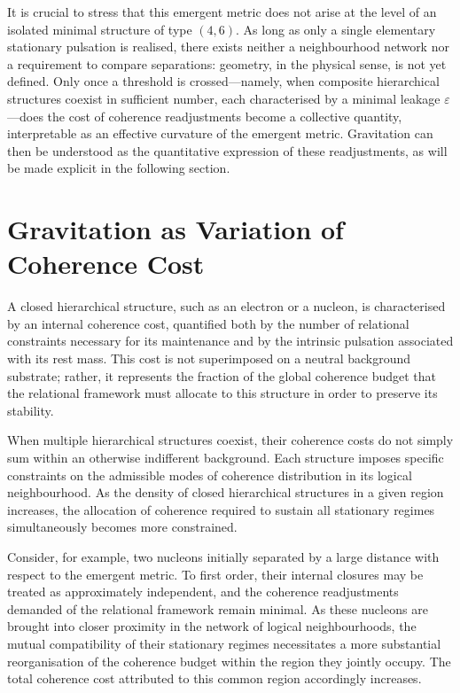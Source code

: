 \documentclass[11pt,a4paper]{article}
\begin{document}
It is crucial to stress that this emergent metric does not arise at the level of an isolated minimal structure of type \((4,6)\). As long as only a single elementary stationary pulsation is realised, there exists neither a neighbourhood network nor a requirement to compare separations: geometry, in the physical sense, is not yet defined. Only once a threshold is crossed—namely, when composite hierarchical structures coexist in sufficient number, each characterised by a minimal leakage \(\varepsilon\)—does the cost of coherence readjustments become a collective quantity, interpretable as an effective curvature of the emergent metric. Gravitation can then be understood as the quantitative expression of these readjustments, as will be made explicit in the following section.

\section{Gravitation as Variation of Coherence Cost}

A closed hierarchical structure, such as an electron or a nucleon, is characterised by an internal coherence cost, quantified both by the number of relational constraints necessary for its maintenance and by the intrinsic pulsation associated with its rest mass. This cost is not superimposed on a neutral background substrate; rather, it represents the fraction of the global coherence budget that the relational framework must allocate to this structure in order to preserve its stability.

When multiple hierarchical structures coexist, their coherence costs do not simply sum within an otherwise indifferent background. Each structure imposes specific constraints on the admissible modes of coherence distribution in its logical neighbourhood. As the density of closed hierarchical structures in a given region increases, the allocation of coherence required to sustain all stationary regimes simultaneously becomes more constrained.

Consider, for example, two nucleons initially separated by a large distance with respect to the emergent metric. To first order, their internal closures may be treated as approximately independent, and the coherence readjustments demanded of the relational framework remain minimal. As these nucleons are brought into closer proximity in the network of logical neighbourhoods, the mutual compatibility of their stationary regimes necessitates a more substantial reorganisation of the coherence budget within the region they jointly occupy. The total coherence cost attributed to this common region accordingly increases.
\end{document}
